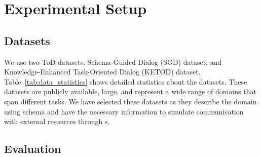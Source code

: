 \vspace{-3pt}
\section{Experimental Setup}
\vspace{-4pt}

\subsection{Datasets}
We use two ToD datasets: Schema-Guided Dialog (SGD) dataset, and Knowledge-Enhanced Task-Oriented Dialog (KETOD) dataset. 
Table~\ref{tab:data_statistics} shows detailed statistics about the datasets.
These datasets are publicly available, large, and represent a wide range of domains that span different tasks.
We have selected these datasets as they describe the domain using schema and have the necessary information to simulate communication with external resources through {\apicall}s.


\vspace{-3pt}
\subsection{Evaluation}

